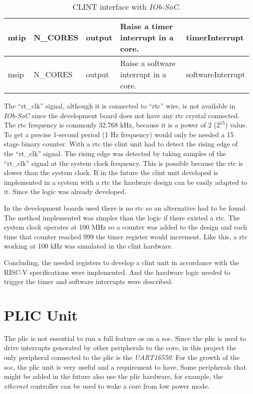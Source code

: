 \begin{table}[!ht]
{\begin{tabular}{|l|l|l|l|l|}
  mtip          & N\_CORES       & output             & Raise a timer interrupt in a core.                                                                  & timerInterrupt                       \\ \hline
  msip          & N\_CORES       & output             & Raise a software interrupt in a core.                                                               & softwareInterrupt                    \\ \hline
  \end{tabular}%
  }
  \caption{CLINT interface with \textit{IOb-SoC}.}
  \label{tab:clint_signals}
\end{table}

The \enquote{rt\_clk} signal, although it is connected to \enquote{rtc} wire, is not available in \textit{IOb-SoC} since the development board does not have any \acrfull{rtc} crystal connected. The \acrshort{rtc} frequency is commonly 32.768 kHz, because it is a power of 2 ($2^15$) value. To get a precise 1-second period (1 Hz frequency) would only be needed a 15 stage binary counter. With a \acrshort{rtc} the \acrshort{clint} unit had to detect the rising edge of the \enquote{rt\_clk} signal. The rising edge was detected by taking samples of the \enquote{rt\_clk} signal at the system clock frequency. This is possible because the \acrshort{rtc} is slower than the system clock. If in the future the \acrshort{clint} unit developed is implemented in a system with a \acrshort{rtc} the hardware design can be easily adapted to it. Since the logic was already developed. %

In the development boards used there is no \acrshort{rtc} so an alternative had to be found. The method implemented was simpler than the logic if there existed a \acrshort{rtc}. The system clock operates at 100 MHz so a counter was added to the design and each time that counter reached 999 the timer register would increment. Like this, a \acrshort{rtc} working at 100 kHz was simulated in the \acrshort{clint} hardware.

Concluding, the needed registers to develop a \acrshort{clint} unit in accordance with the RISC-V specifications were implemented. And the hardware logic needed to trigger the timer and software interrupts were described.

\section{PLIC Unit}
\label{section:plic}
The \acrshort{plic} is not essential to run a full feature \acrfull{os} on a \acrfull{soc}. Since the \acrshort{plic} is used to drive interrupts generated by other peripherals to the core, in this project the only peripheral connected to the \acrshort{plic} is the \textit{UART16550}. For the growth of the \acrshort{soc}, the \acrshort{plic} unit is very useful and a requirement to have. Some peripherals that might be added in the future also use the \acrshort{plic} hardware, for example, the \textit{ethernet} controller can be used to wake a core from low power mode.


